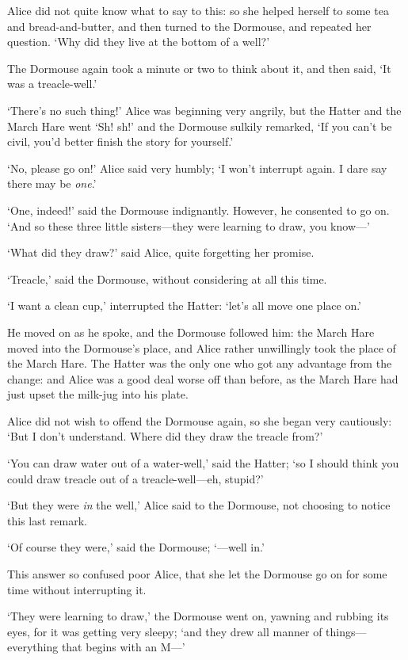 \documentclass[12pt,openany]{memoir}
\begin{document}
Alice did not quite know what to say to this: so she helped herself to some tea and bread-and-butter, and then turned to the Dormouse, and repeated her question. `Why did they live at the bottom of a well?'

The Dormouse again took a minute or two to think about it, and then said, `It was a treacle-well.'

`There's no such thing!' Alice was beginning very angrily, but the Hatter and the March Hare went `Sh! sh!' and the Dormouse sulkily remarked, `If you can't be civil, you'd better finish the story for yourself.'

`No, please go on!' Alice said very humbly; `I won't interrupt again. I dare say there may be \textit{one}.'

`One, indeed!' said the Dormouse indignantly. However, he consented to go on. `And so these three little sisters---they were learning to draw, you know---'

`What did they draw?' said Alice, quite forgetting her promise.

`Treacle,' said the Dormouse, without considering at all this time.

`I want a clean cup,' interrupted the Hatter: `let's all move one place on.'

He moved on as he spoke, and the Dormouse followed him: the March Hare moved into the Dormouse's place, and Alice rather unwillingly took the place of the March Hare. The Hatter was the only one who got any advantage from the change: and Alice was a good deal worse off than before, as the March Hare had just upset the milk-jug into his plate.

Alice did not wish to offend the Dormouse again, so she began very cautiously: `But I don't understand. Where did they draw the treacle from?'

`You can draw water out of a water-well,' said the Hatter; `so I should think you could draw treacle out of a treacle-well---eh, stupid?'

`But they were \textit{in} the well,' Alice said to the Dormouse, not choosing to notice this last remark.

`Of course they were,' said the Dormouse; `---well in.'

This answer so confused poor Alice, that she let the Dormouse go on for some time without interrupting it.

`They were learning to draw,' the Dormouse went on, yawning and rubbing its eyes, for it was getting very sleepy; `and they drew all manner of things---everything that begins with an M---'
\end{document}
